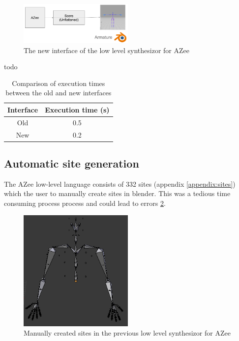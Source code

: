 \documentclass[../../main.tex]{subfiles}
\begin{document}
\begin{figure}[h]
    \centering
    \includegraphics[width=0.5\textwidth]{chapters/rigging_layers/images/new_interface.png}
    \caption{The new interface of the low level synthesizor for AZee}
    \label{fig:new_interface}
\end{figure}

todo
\begin{table}
    \centering
    \begin{tabular}{|c|c|}
        \hline
        \textbf{Interface} & \textbf{Execution time (s)} \\
        \hline
        Old & 0.5 \\
        New & 0.2 \\
        \hline
    \end{tabular}
    \caption{Comparison of execution times between the old and new interfaces}
    \label{tab:faster_executions}
\end{table}

\subsection{Automatic site generation}

The AZee low-level language consists of 332 sites (appendix \ref{appendix:sites}) which the user to manually create sites in blender. This was a tedious time consuming process process and could lead to errors \ref{fig:prev_sites}.

\begin{figure}[h]
    \centering
    \includegraphics[width=0.5\textwidth]{chapters/rigging_layers/images/prev_sites.png}
    \caption{Manually created sites in the previous low level synthesizor for AZee}
    \label{fig:prev_sites}
\end{figure}
\end{document}
